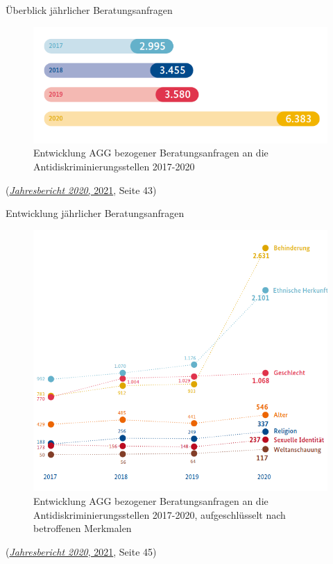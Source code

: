 \documentclass[
  10pt,
  ngerman,
  ignorenonframetext,
]{beamer}
\begin{document}
\begin{frame}{Überblick jährlicher Beratungsanfragen}
\protect\hypertarget{uxfcberblick-juxe4hrlicher-beratungsanfragen}{}
\begin{figure}
\centering
\includegraphics[width=\textwidth,height=0.4\textheight]{plots/entwicklung_beratungsanfragen_agg_s43.png}
\caption{Entwicklung AGG bezogener Beratungsanfragen an die
Antidiskriminierungsstellen 2017-2020}
\end{figure}

(\protect\hyperlink{ref-jb2020}{\emph{Jahresbericht 2020}, 2021}, Seite
43)
\end{frame}

\begin{frame}{Entwicklung jährlicher Beratungsanfragen}
\protect\hypertarget{entwicklung-juxe4hrlicher-beratungsanfragen}{}
\begin{figure}
\centering
\includegraphics[width=\textwidth,height=0.5\textheight]{plots/entwicklung_beratungsanfragen_nach_merkmalen_s45.png}
\caption{Entwicklung AGG bezogener Beratungsanfragen an die
Antidiskriminierungsstellen 2017-2020, aufgeschlüsselt nach betroffenen
Merkmalen}
\end{figure}

(\protect\hyperlink{ref-jb2020}{\emph{Jahresbericht 2020}, 2021}, Seite
45)
\end{frame}
\end{document}

